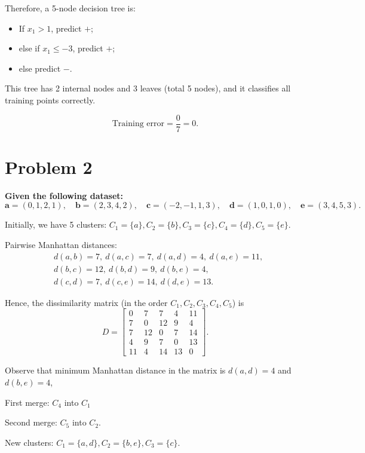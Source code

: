 \documentclass[fleqn]{article}
\begin{document}
    \noindent Therefore, a 5-node decision tree is:
    \begin{itemize}
        \item If $x_1>1$, predict $+$;
        \item else if $x_1\le -3$, predict $+$;
        \item else predict $-$.
    \end{itemize}
    \noindent This tree has 2 internal nodes and 3 leaves (total 5 nodes), and it classifies all training points correctly.

    \[
    \text{Training error}=\frac{0}{7}=0.
    \]

    \newpage
    \section{Problem 2}
    \textbf{Given the following dataset:}
    \[
    \textbf{a} = (0,1,2,1), \quad \textbf{b} = (2,3,4,2), \quad \textbf{c} = (-2,-1,1,3), \quad \textbf{d} = (1,0,1,0), \quad \textbf{e} = (3,4,5,3).
    \]

    \noindent Initially, we have 5 clusters: $C_1=\{a\}, C_2=\{b\}, C_3=\{c\}, C_4=\{d\}, C_5=\{e\}$.

    \noindent Pairwise Manhattan distances:
    \[
    \begin{aligned}
    &d(a,b)=7,\ d(a,c)=7,\ d(a,d)=4,\ d(a,e)=11,\\
    &d(b,c)=12,\ d(b,d)=9,\ d(b,e)=4,\\
    &d(c,d)=7,\ d(c,e)=14,\ d(d,e)=13.
    \end{aligned}
    \]

    \noindent Hence, the dissimilarity matrix (in the order $C_1, C_2, C_3, C_4, C_5$) is
    \[
    D=
    \begin{bmatrix}
    0 & 7 & 7 & 4 & 11\\
    7 & 0 & 12 & 9 & 4\\
    7 & 12 & 0 & 7 & 14\\
    4 & 9 & 7 & 0 & 13\\
    11 & 4 & 14 & 13 & 0
    \end{bmatrix}.
    \]

    \noindent Observe that minimum Manhattan distance in the matrix is $d(a,d)=4$ and $d(b,e)=4$,

    \medskip
    First merge: $C_4$ into $C_1$ 

    Second merge: $C_5$ into $C_2$.

    \medskip
    \noindent New clusters: $C_1=\{a,d\}, C_2=\{b,e\}, C_3=\{c\}$.
\end{document}
